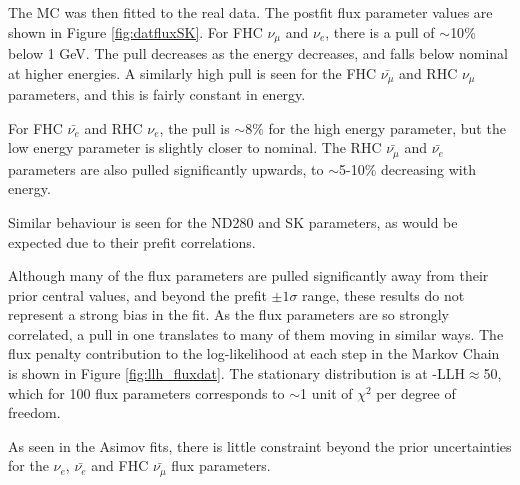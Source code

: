 The MC was then fitted to the real data. The postfit flux parameter values are shown in Figure \ref{fig:datfluxSK}. For FHC $\nu_{\mu}$ and $\nu_e$, there is a pull of $\sim$10$\%$ below 1 GeV. The pull decreases as the energy decreases, and falls below nominal at higher energies. A similarly high pull is seen for the FHC $\bar{\nu_{\mu}}$ and RHC $\nu_{\mu}$ parameters, and this is fairly constant in energy.

For FHC $\bar{\nu_e}$ and RHC $\nu_e$, the pull is $\sim$8$\%$ for the high energy parameter, but the low energy parameter is slightly closer to nominal. The RHC $\bar{\nu_{\mu}}$ and $\bar{\nu_e}$ parameters are also pulled significantly upwards, to $\sim$5-10$\%$ decreasing with energy.

Similar behaviour is seen for the ND280 and SK parameters, as would be expected due to their prefit correlations.

Although many of the flux parameters are pulled significantly away from their prior central values, and beyond the prefit $\pm1\sigma$ range, these results do not represent a strong bias in the fit. As the flux parameters are so strongly correlated, a pull in one translates to many of them moving in similar ways. The flux penalty contribution to the log-likelihood at each step in the Markov Chain is shown in Figure \ref{fig:llh_fluxdat}. The stationary distribution is at -LLH$\approx$50, which for 100 flux parameters corresponds to $\sim$1 unit of $\chi^2$ per degree of freedom.

As seen in the Asimov fits, there is little constraint beyond the prior uncertainties for the $\nu_e$, $\bar{\nu_e}$ and FHC $\bar{\nu_{\mu}}$ flux parameters.

